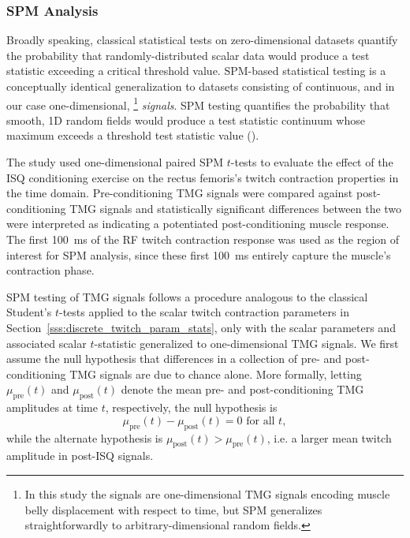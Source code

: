 \documentclass[utf8]{FrontiersinHarvard}
\begin{document}
\subsubsection{SPM Analysis} \label{sss:spm_analysis}
Broadly speaking, classical statistical tests on zero-dimensional datasets quantify the probability that randomly-distributed scalar data would produce a test statistic exceeding a critical threshold value.
SPM-based statistical testing is a conceptually identical generalization to datasets consisting of continuous, and in our case one-dimensional,%
\footnote{In this study the signals are one-dimensional TMG signals encoding muscle belly displacement with respect to time, but SPM generalizes straightforwardly to arbitrary-dimensional random fields.}
\textit{signals}.
SPM testing quantifies the probability that smooth, 1D random fields would produce a test statistic continuum whose maximum exceeds a threshold test statistic value (\cite{pataky-spm1d, pataky-roi, pataky}).

The study used one-dimensional paired SPM $ t $-tests to evaluate the effect of the ISQ conditioning exercise on the rectus femoris's twitch contraction properties in the time domain.
Pre-conditioning TMG signals were compared against post-conditioning TMG signals and statistically significant differences between the two were interpreted as indicating a potentiated post-conditioning muscle response.
The first \SI{100}{\milli \second} of the RF twitch contraction response was used as the region of interest for SPM analysis, since these first \SI{100}{\milli \second} entirely capture the muscle's contraction phase.

SPM testing of TMG signals follows a procedure analogous to the classical Student's $ t $-tests applied to the scalar twitch contraction parameters in Section~\ref{sss:discrete_twitch_param_stats}, only with the scalar parameters and associated scalar $ t $-statistic generalized to one-dimensional TMG signals.
We first assume the null hypothesis that differences in a collection of pre- and post-conditioning TMG signals are due to chance alone.
More formally, letting $ \mu_{\mathrm{pre}}(t) $ and $ \mu_{\mathrm{post}}(t) $ denote the mean pre- and post-conditioning TMG amplitudes at time $ t $, respectively, the null hypothesis is
\begin{equation}
    \mu_{\text{pre}}(t) - \mu_{\text{post}} (t) = 0 \text{ for all } t, \label{eq:spm_null_hypothesis}
\end{equation}
while the alternate hypothesis is $ \mu_{\text{post}}(t) > \mu_{\text{pre}}(t) $, i.e. a larger mean twitch amplitude in post-ISQ signals.
\end{document}
